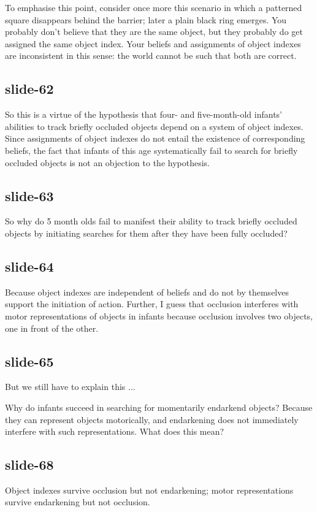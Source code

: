 \documentclass[12pt,\papersize]{extarticle}
\begin{document}
To emphasise this point, consider once more this scenario
in which a patterned square disappears behind the barrier; later a
plain black ring emerges.  You probably don't believe that they are
the same object, but they probably do get assigned the same object index.
Your beliefs and assignments of object indexes are inconsistent in this
sense: the world cannot be such that both are correct.

\subsection{slide-62}
So this is a virtue of the hypothesis that four- and five-month-old
infants’ abilities
to track briefly occluded objects depend on a system of
object indexes.
Since assignments of object indexes do not entail the existence of
corresponding beliefs,
the fact that infants of this age systematically
fail to search for briefly occluded objects is not an objection to the
hypothesis.

\subsection{slide-63}
So why do 5 month olds fail to manifest their ability to track briefly
occluded objects by initiating searches for them after they have been
fully occluded?

\subsection{slide-64}
Because object indexes are independent of beliefs
and do not by themselves support the initiation of action.
Further, I guess that occlusion interferes
with motor representations  of objects in infants because occlusion
involves two objects, one in front of the other.

\subsection{slide-65}
But we still have to explain this ...

Why do infants succeed in searching for momentarily endarkend objects?
Because they can represent objects motorically, and endarkening does
not immediately interfere with such representations.
What does this mean?

\subsection{slide-68}
Object indexes survive occlusion but not endarkening;
motor representations survive endarkening but not occlusion.
\end{document}
